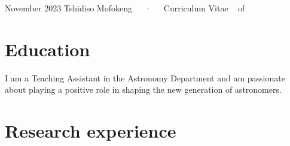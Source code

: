 \documentclass[11pt,a4paper,]{awesome-cv}
\begin{document}
\makecvheader

\makecvfooter
  {November 2023}
    {Tshidiso Mofokeng~~~·~~~Curriculum Vitae}
  {\thepage~ of \pageref{LastPage}~}





\hypertarget{education}{%
\section{Education}\label{education}}

I am a Teaching Assistant in the Astronomy Department and am passionate
about playing a positive role in shaping the new generation of
astronomers.

\begin{cventries}
\end{cventries}

\hypertarget{research-experience}{%
\section{Research experience}\label{research-experience}}
\end{document}
